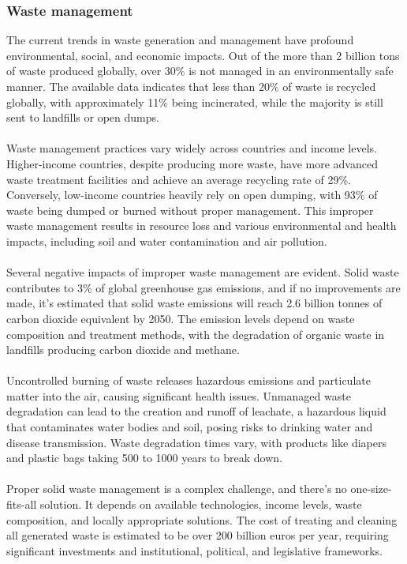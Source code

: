 \documentclass[../summary.tex]{subfiles}
\begin{document}
\subsubsection{Waste management}

The current trends in waste generation and management have profound environmental, social, and economic impacts. Out of the more than 2 billion tons of waste produced globally, over 30\% is not managed in an environmentally safe manner. The available data indicates that less than 20\% of waste is recycled globally, with approximately 11\% being incinerated, while the majority is still sent to landfills or open dumps.\\
\\
Waste management practices vary widely across countries and income levels. Higher-income countries, despite producing more waste, have more advanced waste treatment facilities and achieve an average recycling rate of 29\%. Conversely, low-income countries heavily rely on open dumping, with 93\% of waste being dumped or burned without proper management. This improper waste management results in resource loss and various environmental and health impacts, including soil and water contamination and air pollution.\\
\\
Several negative impacts of improper waste management are evident. Solid waste contributes to 3\% of global greenhouse gas emissions, and if no improvements are made, it's estimated that solid waste emissions will reach 2.6 billion tonnes of carbon dioxide equivalent by 2050. The emission levels depend on waste composition and treatment methods, with the degradation of organic waste in landfills producing carbon dioxide and methane.\\
\\
Uncontrolled burning of waste releases hazardous emissions and particulate matter into the air, causing significant health issues. Unmanaged waste degradation can lead to the creation and runoff of leachate, a hazardous liquid that contaminates water bodies and soil, posing risks to drinking water and disease transmission. Waste degradation times vary, with products like diapers and plastic bags taking 500 to 1000 years to break down.\\
\\
Proper solid waste management is a complex challenge, and there's no one-size-fits-all solution. It depends on available technologies, income levels, waste composition, and locally appropriate solutions. The cost of treating and cleaning all generated waste is estimated to be over 200 billion euros per year, requiring significant investments and institutional, political, and legislative frameworks.\\
\end{document}
